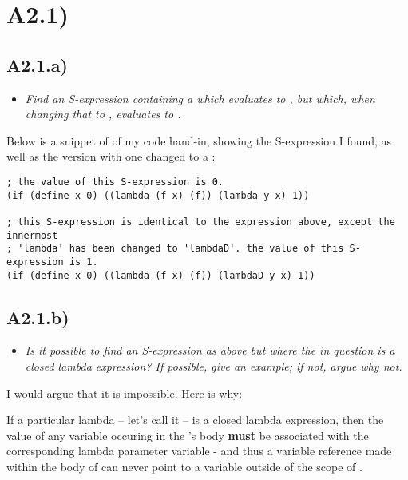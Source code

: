 \section{A2.1)}


\subsection{A2.1.a)}

\begin{itemize}
    \item \emph{Find an S-expression containing a  which
        evaluates to , but which, when changing that  to
        , evaluates to .}
\end{itemize}


Below is a snippet of  of my code hand-in, showing the S-expression
I found, as well as the version with one  changed to a :

\begin{verbatim}
; the value of this S-expression is 0.
(if (define x 0) ((lambda (f x) (f)) (lambda y x) 1))
    
; this S-expression is identical to the expression above, except the innermost
; 'lambda' has been changed to 'lambdaD'. the value of this S-expression is 1.
(if (define x 0) ((lambda (f x) (f)) (lambdaD y x) 1))
\end{verbatim}


\subsection{A2.1.b)}
\begin{itemize}
    \item \emph{Is it possible to find an S-expression as above but where the
         in question is a closed lambda expression? If possible, give
        an example; if not, argue why not.}
\end{itemize}

I would argue that it is impossible. Here is why:

\smallskip

If a particular lambda -- let's call it  -- is a closed lambda
expression, then the value of any variable occuring in the 's body
\textbf{must} be associated with the corresponding lambda parameter variable -
and thus a variable reference made within the body of  can never point
to a variable outside of the scope of . 

